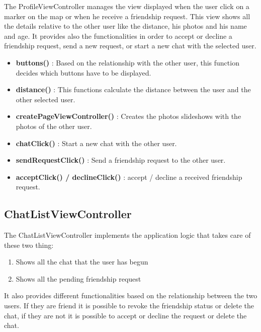 The ProfileViewController manages the view displayed when the user click on a marker on the map or when he receive a friendship request. This view shows all the details relative to the other user like the distance, his photos and his name and age. It provides also the functionalities in order to accept or decline a friendship request, send a new request, or start a new chat with the selected user.

\begin{itemize}
\item \textbf{buttons()} : Based on the relationship with the other user, this function decides which buttons have to be displayed.
\item \textbf{distance()} : This functions calculate the distance between the user and the other selected user.
\item \textbf{createPageViewController()} : Creates the photos slideshows with the photos of the other user.
\item \textbf{chatClick()} : Start a new chat with the other user.
\item \textbf{sendRequestClick()} : Send a friendship request to the other user.
\item \textbf{acceptClick() / declineClick()} : accept / decline a received friendship request.
\end{itemize}


\subsection{ChatListViewController} 

The ChatListViewController implements the application logic that takes care of these two thing:

\begin{enumerate}
\item Shows all the chat that the user has begun
\item Shows all the pending friendship request
\end{enumerate}

It also provides different functionalities based on the relationship between the two users. If they are friend it is possible to revoke the friendship status or delete the chat, if they are not it is possible to accept or decline the request or delete the chat.

